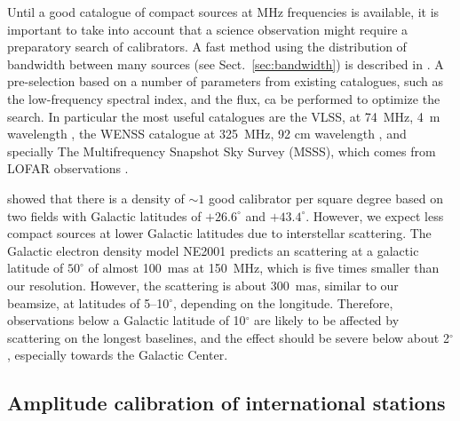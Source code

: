 \documentclass[graybox]{svmult}
\begin{document}
Until a good catalogue of compact sources at MHz frequencies is available, it
is important to take into account that a science observation might require a
preparatory search of calibrators. A fast method using the distribution of
bandwidth between many sources (see Sect.~\ref{sec:bandwidth}) is described in
\cite{moldon15}. A pre-selection based on a number of parameters from existing
catalogues, such as the low-frequency spectral index, and the flux, ca be
performed to optimize the search. In particular the most useful catalogues are
the VLSS, at 74~MHz, 4~m wavelength \citep{lane12a}, the WENSS catalogue at
325~MHz, 92 cm wavelength \citep{rengelink97}, and specially The Multifrequency
Snapshot Sky Survey (MSSS), which comes from LOFAR observations
\citep{heald14}. 

\cite{moldon15} showed that there is a density of $\sim1$ good calibrator per
square degree based on two fields with Galactic latitudes of $+26.6^{\circ}$
and $+43.4^{\circ} $. However, we expect less compact sources at lower Galactic
latitudes due to interstellar scattering. The Galactic electron density model
NE2001 \citep{cordes02} predicts an scattering at a galactic latitude of
$50^{\circ}$ of almost 100~mas at 150~MHz, which is five times smaller than our
resolution. However, the scattering is about 300~mas, similar to our beamsize,
at latitudes of 5--10$^{\circ}$, depending on the longitude. Therefore,
observations below a Galactic latitude of 10$^{\circ}$ are likely to be
affected by scattering on the longest baselines, and the effect should be
severe below about 2$^{\circ}$, especially towards the Galactic Center. 

\subsection{Amplitude calibration of international stations}
\end{document}
